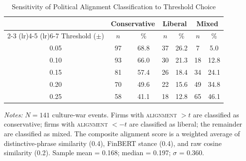 \begin{table}[htbp]
\centering
\caption{Sensitivity of Political Alignment Classification to Threshold Choice}
\label{tab:threshold_sensitivity}
\begin{tabular}{ccccccc}
\toprule
 & \multicolumn{2}{c}{Conservative} & \multicolumn{2}{c}{Liberal} & \multicolumn{2}{c}{Mixed} \\
\cmidrule(lr){2-3} \cmidrule(lr){4-5} \cmidrule(lr){6-7}
Threshold ($\pm$) & $n$ & \% & $n$ & \% & $n$ & \% \\
\midrule
0.05 & 97 & 68.8 & 37 & 26.2 &  7 &  5.0 \\
0.10 & 93 & 66.0 & 30 & 21.3 & 18 & 12.8 \\
0.15 & 81 & 57.4 & 26 & 18.4 & 34 & 24.1 \\
0.20 & 70 & 49.6 & 22 & 15.6 & 49 & 34.8 \\
0.25 & 58 & 41.1 & 18 & 12.8 & 65 & 46.1 \\
\bottomrule
\end{tabular}
\begin{tablenotes}[flushleft]
\small
\item \textit{Notes:} $N = 141$ culture-war events. Firms with \textsc{alignment} $> t$ are classified as conservative; firms with \textsc{alignment} $< -t$ are classified as liberal; the remainder are classified as mixed. The composite alignment score is a weighted average of distinctive-phrase similarity (0.4), FinBERT stance (0.4), and raw cosine similarity (0.2). Sample mean = 0.168; median = 0.197; $\sigma$ = 0.360.
\end{tablenotes}
\end{table}
